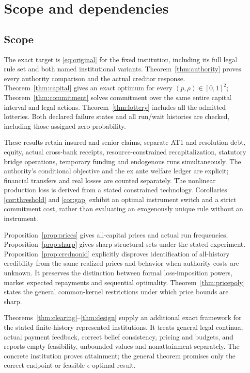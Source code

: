 \documentclass[11pt,a4paper]{article}
\numberwithin{equation}{section}
\theoremstyle{definition}
\begin{document}
\section{Scope and dependencies}\label{sec:scope}

\subsection{Scope}
The exact target is \eqref{eq:original} for the fixed institution,
including its full legal rule set and both named institutional variants.
Theorem~\ref{thm:authority} proves every authority comparison and the
actual creditor response. Theorem~\ref{thm:capital} gives an exact optimum
for every \((p,\rho)\in[0,1]^2\); Theorem~\ref{thm:commitment} solves
commitment over the same entire capital interval and legal actions.
Theorem~\ref{thm:lottery} includes all the admitted lotteries. Both declared
failure states and all run/wait histories are checked, including those
assigned zero probability.

These results retain insured and senior claims, separate AT1 and
resolution debt, equity, actual cross-bank receipts, resource-constrained
recapitalization, statutory bridge operations, temporary funding and
endogenous runs simultaneously. The authority's conditional objective
and the ex ante welfare ledger are explicit; financial transfers and
real losses are counted separately. The nonlinear production loss is
derived from a stated constrained technology. Corollaries
\ref{cor:threshold} and \ref{cor:gap} exhibit an optimal instrument switch
and a strict commitment cost, rather than evaluating an exogenously
unique rule without an instrument.

Proposition~\ref{prop:prices} gives all-capital prices and actual run
frequencies; Proposition~\ref{prop:sharp} gives sharp structural sets
under the stated experiment. Proposition~\ref{prop:crednonid} explicitly
disproves identification of all-history credibility from the same
realized prices and behavior when authority costs are unknown. It
preserves the distinction between formal loss-imposition powers,
market expected repayments and sequential optimality.
Theorem~\ref{thm:pricepoly} states the general common-kernel restrictions
under which price bounds are sharp.

Theorems~\ref{thm:clearing}--\ref{thm:design} supply an additional exact
framework for the stated finite-history represented institutions.
It treats general legal continua, actual payment feedback, correct
belief consistency, pricing and budgets, and reports empty feasibility,
unbounded values and nonattainment separately. The concrete institution
proves attainment; the general theorem promises only the correct
endpoint or feasible \(\epsilon\)-optimal result.
\end{document}
